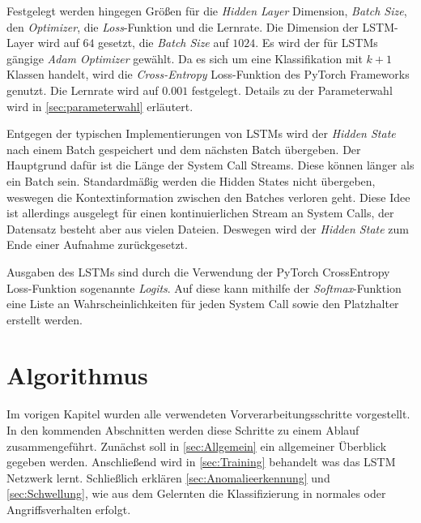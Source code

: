         Festgelegt werden hingegen Größen für die \textit{Hidden Layer} Dimension, \textit{Batch Size}, den \textit{Optimizer}, die \textit{Loss}-Funktion und die Lernrate.
        Die Dimension der \ac{LSTM}-Layer wird auf $64$ gesetzt, die \textit{Batch Size} auf $1024$.
        Es wird der für \acp{LSTM} gängige \textit{Adam Optimizer} gewählt.
        Da es sich um eine Klassifikation mit $k+1$ Klassen handelt, wird die \textit{Cross-Entropy} Loss-Funktion des PyTorch Frameworks genutzt.
        Die Lernrate wird auf $0.001$ festgelegt.
        Details zu der Parameterwahl wird in \autoref{sec:parameterwahl} erläutert.

        Entgegen der typischen Implementierungen von \acp{LSTM} wird der \textit{Hidden State} nach einem Batch gespeichert und dem nächsten Batch  übergeben. 
        Der Hauptgrund dafür ist die Länge der System Call Streams.
        Diese können länger als ein Batch sein.
        Standardmäßig werden die Hidden States nicht übergeben, weswegen die Kontextinformation zwischen den Batches verloren geht.
        Diese Idee ist allerdings ausgelegt für einen kontinuierlichen Stream an System Calls, der Datensatz besteht aber aus vielen Dateien.
        Deswegen wird der \textit{Hidden State} zum Ende einer Aufnahme zurückgesetzt.

        Ausgaben des \acp{LSTM} sind durch die Verwendung der PyTorch CrossEntropy Loss-Funktion sogenannte \textit{Logits}.
        Auf diese kann mithilfe der \textit{Softmax}-Funktion eine Liste an Wahrscheinlichkeiten für jeden System Call sowie den Platzhalter erstellt werden.

    \section{Algorithmus}\label{sec:Algorithmus}
        Im vorigen Kapitel wurden alle verwendeten Vorverarbeitungsschritte vorgestellt.
        In den kommenden Abschnitten werden diese Schritte zu einem Ablauf zusammengeführt.
        Zunächst soll in \autoref{sec:Allgemein} ein allgemeiner Überblick gegeben werden.
        Anschließend wird in \autoref{sec:Training} behandelt was das \ac{LSTM} Netzwerk lernt.
        Schließlich erklären \autoref{sec:Anomalieerkennung} und \autoref{sec:Schwellung}, wie aus dem Gelernten die Klassifizierung in normales oder Angriffsverhalten erfolgt.

